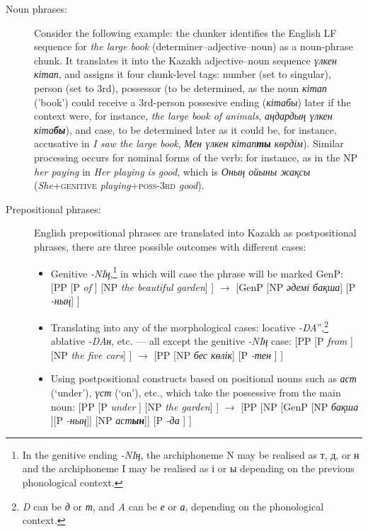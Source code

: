 \documentclass[11pt]{article}
\begin{document}
\begin{description}
\item[Noun phrases:] Consider the following example: the chunker identifies the English LF sequence for \emph{the large book}  (determiner--adjective--noun) as a noun-phrase chunk. It translates it into the Kazakh adjective--noun sequence \emph{үлкен кітап}, and assigns it four chunk-level tags: number (set to singular), person (set to 3rd), 
  possessor (to be determined, as the noun \emph{кітап} ('book') could receive a 3rd-person possesive 
  ending (\emph{кітабы}) later if the context were, for instance, \emph{the large book of animals}, \emph{аңдардың үлкен кіта\textbf{бы}}), 
  and case, to be determined later as it could be, for instance, accusative in \emph{I saw the large book}, \emph{Мен үлкен кітап\textbf{ты} көрдім}). Similar processing occurs for nominal forms of the verb: for instance, as in the NP \emph{her paying} in \emph{Her playing is good}, which is  \emph{Оның ойыны жақсы} (\emph{She}+\textsc{genitive} \emph{playing}+\textsc{poss-3rd} \emph{good}). 
\item[Prepositional phrases:] English prepositional phrases are translated into Kazakh as postpositional phrases, 
  there are three possible outcomes with different cases:
   \begin{itemize}
    \item Genitive \emph{-NIң},\footnote{In the genitive ending \emph{-{N}{I}ң}, the archiphoneme {N} may be realised as т, д, or н and the archiphoneme {I} may be realised as  і  or ы depending on the previous phonological context. } in which will case the phrase will be marked GenP:  
        [PP [P \emph{of} ] [NP \emph{the beautiful garden}] ] $\rightarrow$ [GenP [NP \emph{әдемі бақша}] [P \emph{-ның}] ] 
    \item Translating into any of the morphological cases: locative \emph{-{D}{A}}'',\footnote{\emph{D} can be \emph{д} or \emph{т}, and \emph{{A}} can be \emph{е} or \emph{а}, depending on the 
        phonological context.} ablative \emph{-{D}{A}н}, etc. --- all except the genitive \emph{-{N}{I}ң} case: 
        [PP [P \emph{from} ] [NP \emph{the five cars}] ] $\rightarrow$ [PP [NP \emph{бес көлік}] [P \emph{-тен} ] ]
    \item Using postpositional constructs based on positional nouns such as \emph{аст} (`under'), \emph{үст} (`on'), etc., which take the possessive from the main noun:  
        [PP [P \emph{under} ] [NP \emph{the garden}] ] $\rightarrow$ [PP [NP [GenP [NP \emph{бақша} ][P \emph{-ның}]] [NP \emph{аст\textbf{ын}}]] [P \emph{-да} ] ]

\end{itemize}
\end{description}
\end{document}
